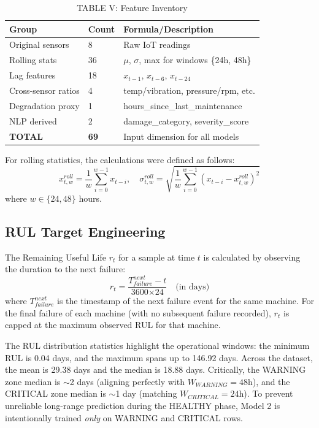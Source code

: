 \documentclass[conference]{IEEEtran}
\begin{document}
\begin{table}[htbp]
\caption{TABLE V: Feature Inventory}
\centering
\begin{tabular}{lll}
\hline
\textbf{Group} & \textbf{Count} & \textbf{Formula/Description} \\
\hline
Original sensors & 8 & Raw IoT readings \\
Rolling stats & 36 & $\mu$, $\sigma$, max for windows \{24h, 48h\} \\
Lag features & 18 & $x_{t-1}$, $x_{t-6}$, $x_{t-24}$ \\
Cross-sensor ratios & 4 & temp/vibration, pressure/rpm, etc. \\
Degradation proxy & 1 & hours\_since\_last\_maintenance \\
NLP derived & 2 & damage\_category, severity\_score \\
\hline
\textbf{TOTAL} & \textbf{69} & Input dimension for all models \\
\hline
\end{tabular}
\label{tab:feature_inventory}
\end{table}

For rolling statistics, the calculations were defined as follows:
\begin{equation}
x^{roll}_{t,w} = \frac{1}{w}\sum_{i=0}^{w-1} x_{t-i}, \quad
\sigma^{roll}_{t,w} = \sqrt{\frac{1}{w}\sum_{i=0}^{w-1}(x_{t-i} - x^{roll}_{t,w})^2}
\label{eq:rolling}
\end{equation}
where $w \in \{24, 48\}$ hours.

\subsection{RUL Target Engineering}
The Remaining Useful Life $r_t$ for a sample at time $t$ is calculated by observing the duration to the next failure:
\begin{equation}
r_t = \frac{T^{next}_{failure} - t}{\text{3600} \times \text{24}} \quad \text{(in days)}
\label{eq:rul}
\end{equation}
where $T^{next}_{failure}$ is the timestamp of the next failure event for the same machine. For the final failure of each machine (with no subsequent failure recorded), $r_t$ is capped at the maximum observed RUL for that machine.

The RUL distribution statistics highlight the operational windows: the minimum RUL is 0.04 days, and the maximum spans up to 146.92 days. Across the dataset, the mean is 29.38 days and the median is 18.88 days. Critically, the WARNING zone median is $\sim$2 days (aligning perfectly with $W_{WARNING}=48$h), and the CRITICAL zone median is $\sim$1 day (matching $W_{CRITICAL}=24$h). To prevent unreliable long-range prediction during the HEALTHY phase, Model 2 is intentionally trained \textit{only} on WARNING and CRITICAL rows.
\end{document}
